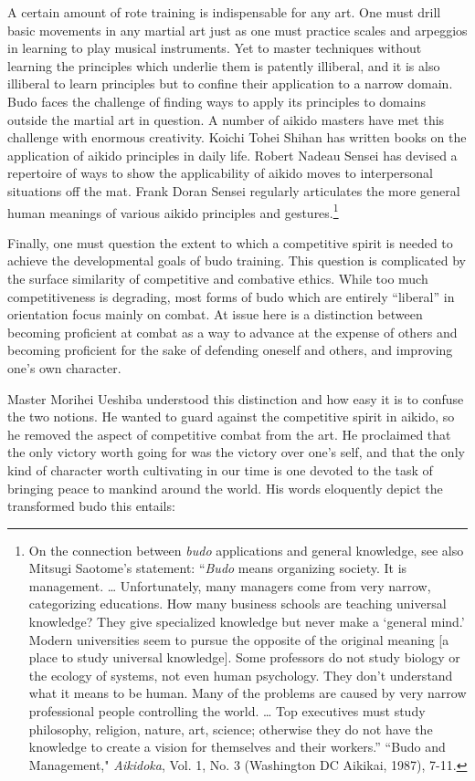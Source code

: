 A certain amount of rote training is indispensable for any art. One must drill basic movements in any martial art just as one must practice scales and arpeggios in learning to play musical instruments. Yet to master techniques without learning the principles which underlie them is patently illiberal, and it is also illiberal to learn principles but to confine their application to a narrow domain. Budo faces the challenge of finding ways to apply its principles to domains outside the martial art in question. A number of aikido masters have met this challenge with enormous creativity. Koichi Tohei Shihan has written books on the application of aikido principles in daily life. Robert Nadeau Sensei has devised a repertoire of ways to show the applicability of aikido moves to interpersonal situations off the mat. Frank Doran Sensei regularly articulates the more general human meanings of various aikido principles and gestures.\footnote{On the connection between \emph{budo} applications and general knowledge, see also Mitsugi Saotome's statement: ``\emph{Budo} means organizing society. It is management. \ldots{} Unfortunately, many managers come from very narrow, categorizing educations. How many business schools are teaching universal knowledge? They give specialized knowledge but never make a `general mind.' Modern universities seem to pursue the opposite of the original meaning [a place to study universal knowledge]. Some professors do not study biology or the ecology of systems, not even human psychology. They don't understand what it means to be human. Many of the problems are caused by very narrow professional people controlling the world. \ldots{} Top executives must study philosophy, religion, nature, art, science; otherwise they do not have the knowledge to create a vision for themselves and their workers.'' ``Budo and Management," \emph{Aikidoka}, Vol. 1, No. 3 (Washington DC Aikikai, 1987), 7-11.}

Finally, one must question the extent to which a competitive spirit is needed to achieve the developmental goals of budo training. This question is complicated by the surface similarity of competitive and combative ethics. While too much competitiveness is degrading, most forms of budo which are entirely ``liberal'' in orientation focus mainly on combat. At issue here is a distinction between becoming proficient at combat as a way to advance at the expense of others and becoming proficient for the sake of defending oneself and others, and improving one's own character.

Master Morihei Ueshiba understood this distinction and how easy it is to confuse the two notions. He wanted to guard against the competitive spirit in aikido, so he removed the aspect of competitive combat from the art. He proclaimed that the only victory worth going for was the victory over one's self, and that the only kind of character worth cultivating in our time is one devoted to the task of bringing peace to mankind around the world. His words eloquently depict the transformed budo this entails:

